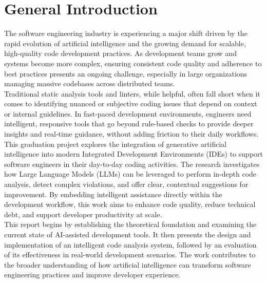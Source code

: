 \chapter*{General Introduction}

\begin{spacing}{1.2}

The software engineering industry is experiencing a major shift driven by the rapid evolution of artificial intelligence and the growing demand for scalable, high-quality code development practices. As development teams grow and systems become more complex, ensuring consistent code quality and adherence to best practices presents an ongoing challenge, especially in large organizations managing massive codebases across distributed teams.\\

Traditional static analysis tools and linters, while helpful, often fall short when it comes to identifying nuanced or subjective coding issues that depend on context or internal guidelines. In fast-paced development environments, engineers need intelligent, responsive tools that go beyond rule-based checks to provide deeper insights and real-time guidance, without adding friction to their daily workflows.\\

This graduation project explores the integration of generative artificial intelligence into modern Integrated Development Environments (IDEs) to support software engineers in their day-to-day coding activities. The research investigates how Large Language Models (LLMs) can be leveraged to perform in-depth code analysis, detect complex violations, and offer clear, contextual suggestions for improvement. By embedding intelligent assistance directly within the development workflow, this work aims to enhance code quality, reduce technical debt, and support developer productivity at scale.\\

This report begins by establishing the theoretical foundation and examining the current state of AI-assisted development tools. It then presents the design and implementation of an intelligent code analysis system, followed by an evaluation of its effectiveness in real-world development scenarios. The work contributes to the broader understanding of how artificial intelligence can transform software engineering practices and improve developer experience.




\end{spacing}


